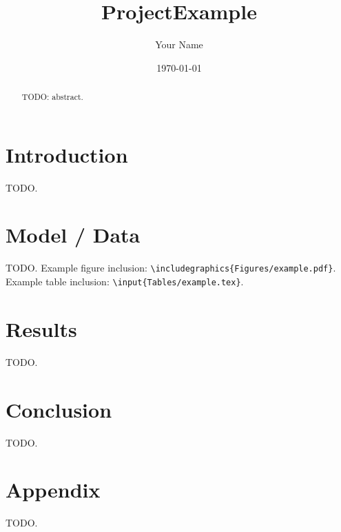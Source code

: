 \documentclass[12pt]{article}
\title{ProjectExample}
\author{Your Name}
\date{\today}
\begin{document}
\maketitle

\begin{abstract}
TODO: abstract.
\end{abstract}

\section{Introduction}
TODO.

\section{Model / Data}
TODO. Example figure inclusion: \texttt{\textbackslash includegraphics\{Figures/example.pdf\}}. Example table inclusion: \texttt{\textbackslash input\{Tables/example.tex\}}.

\section{Results}
TODO.

\section{Conclusion}
TODO.

\printbibliography

\appendix
\section{Appendix}
TODO.
\end{document}
